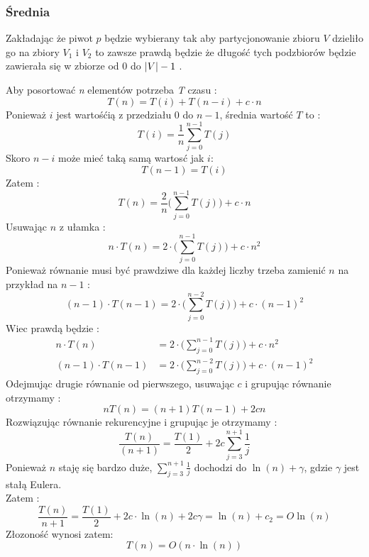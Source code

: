 \subsubsection{Średnia}
Zakładając że piwot $p$ będzie wybierany tak aby partycjonowanie zbioru $V $ dzieliło go na zbiory $V_1$ i $V_2$ to zawsze prawdą będzie że długość tych podzbiorów będzie zawierała się w zbiorze od $0$ do $ \lvert V \rvert-1$ \cite{quicksortAVG}.

Aby posortować \textit{n} elementów potrzeba \textit{T} czasu :
\begin{equation*}
T(n)=T(i)+T(n-i)+c \cdot n
\end{equation*}
Ponieważ $i$ jest wartośćią z przedziału $0$ do $n-1$, średnia wartość $T$ to :
\begin{equation*}
T(i)=\frac{1}{n}\sum_{j=0}^{n-1}T(j)
\end{equation*}
Skoro $n-i$ może mieć taką samą wartosć jak $i$:
\begin{equation*}
T(n-1) = T(i)
\end{equation*}
Zatem :
\begin{equation*}
T(n)=\frac{2}{n} \Bigg( \sum_{j=0}^{n-1}T(j)\Bigg) + c \cdot n
\end{equation*}
Usuwając $n$ z ułamka  :
\begin{equation*}
n \cdot T(n)=2 \cdot \Bigg( \sum_{j=0}^{n-1}T(j)\Bigg) + c \cdot n^{2}
\end{equation*}
Ponieważ równanie musi być prawdziwe dla każdej liczby trzeba zamienić $n$ na przykład na $n-1$ :
\begin{equation*}
(n-1) \cdot T(n-1)=2 \cdot \Bigg( \sum_{j=0}^{n-2}T(j)\Bigg) + c \cdot (n-1)^{2}
\end{equation*}
Wiec prawdą będzie :
\begin{align*}
n \cdot T(n)&=2 \cdot \Bigg( \sum_{j=0}^{n-1}T(j)\Bigg) + c \cdot n^{2}\\
(n-1) \cdot T(n-1)&=2 \cdot \Bigg( \sum_{j=0}^{n-2}T(j)\Bigg) + c \cdot (n-1)^{2}
 \end{align*}
 Odejmując drugie równanie od pierwszego, usuwając $c$ i grupując równanie otrzymamy :
 \begin{equation*}
 nT(n)=(n+1)T(n-1)+2cn
 \end{equation*}
Rozwiązując równanie rekurencyjne i grupując je otrzymamy :
\begin{equation*}
 \frac{T(n)}{(n+1)} = \frac{T(1)}{2} + 2 c \sum_{j=3}^{n+1} \frac{1}{j}
\end{equation*}
Ponieważ $n$ staję się bardzo duże, $\sum_{j=3}^{n+1} \frac{1}{j}$ dochodzi do $\ln(n) +\gamma $, gdzie $\gamma$ jest stałą Eulera.\\
Zatem :
\begin{equation*}
 \frac{T(n)}{n+1} = \frac{T(1)}{2} + 2 c \cdot \ln(n) + 2 c \gamma = \ln(n) + c_2 = O \ln(n) 
\end{equation*}
Złozoność wynosi zatem:
\begin{equation*}
 T(n)=O (n \cdot \ln(n)) 
 \end{equation*}
